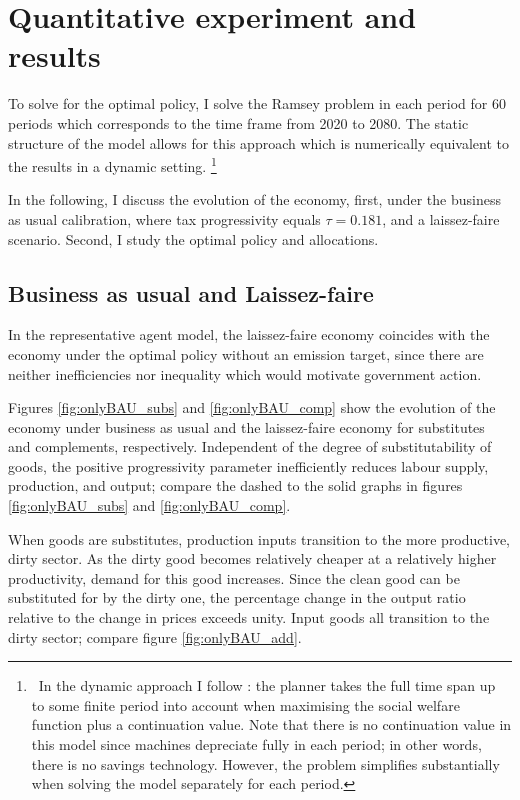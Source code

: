 \section{Quantitative experiment and results}\label{sec:simul}

To solve for the optimal policy, I solve the Ramsey problem in each period for 60 periods which corresponds to the time frame from 2020 to 2080. The static structure of the model allows for this approach which is numerically equivalent to the results in a dynamic setting. \footnote{\ In the dynamic approach I follow : the planner takes the full time span up to some finite period into account when maximising the social welfare function plus a continuation value. Note that there is no continuation value in this model since machines depreciate fully in each period; in other words, there is no savings technology. However, the problem simplifies substantially when solving the model separately for each period. }

In the following, I discuss the evolution of the economy, first, under the business as usual calibration, where tax progressivity equals $\tau =0.181$, and a laissez-faire scenario. Second, I study the optimal policy and allocations.



\subsection{Business as usual and Laissez-faire}
In the representative agent model, the laissez-faire economy coincides with the economy under the optimal policy without an emission target, since there are neither inefficiencies nor inequality which would motivate government action. 

Figures \ref{fig:onlyBAU_subs} and \ref{fig:onlyBAU_comp} show the evolution of the economy under business as usual and the laissez-faire economy for substitutes and complements, respectively.
Independent of the degree of substitutability of goods, the positive progressivity parameter inefficiently reduces labour supply, production, and output; compare the dashed to the solid graphs in  figures \ref{fig:onlyBAU_subs} and \ref{fig:onlyBAU_comp}.

When goods are substitutes, production inputs transition to the more productive, dirty sector. As the dirty good becomes relatively cheaper at a relatively higher productivity, demand for this good increases. Since the clean good can be substituted for by the dirty one, the percentage change in the output ratio relative to the change in prices exceeds unity. Input goods all transition to the dirty sector; compare figure \ref{fig:onlyBAU_add}. 

